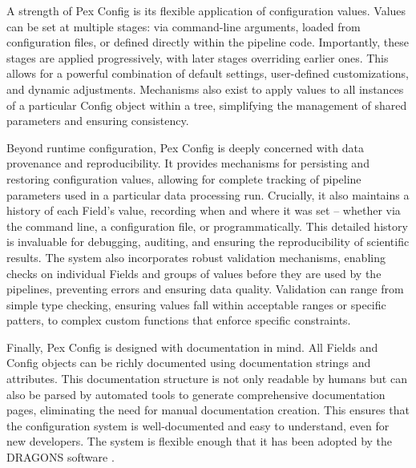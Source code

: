 A strength of Pex Config is its flexible application of configuration values.
Values can be set at multiple stages: via command-line arguments, loaded from configuration files, or defined directly within the pipeline code.
Importantly, these stages are applied progressively, with later stages overriding earlier ones.
This allows for a powerful combination of default settings, user-defined customizations, and dynamic adjustments.
Mechanisms also exist to apply values to all instances of a particular Config object within a tree, simplifying the management of shared parameters and ensuring consistency.


Beyond runtime configuration, Pex Config is deeply concerned with data provenance and reproducibility.
It provides mechanisms for persisting and restoring configuration values, allowing for complete tracking of pipeline parameters used in a particular data processing run.
Crucially, it also maintains a history of each Field's value, recording when and where it was set -- whether via the command line, a configuration file, or programmatically.
This detailed history is invaluable for debugging, auditing, and ensuring the reproducibility of scientific results.
The system also incorporates robust validation mechanisms, enabling checks on individual Fields and groups of values before they are used by the pipelines, preventing errors and ensuring data quality.
Validation can range from simple type checking, ensuring values fall within acceptable ranges or specific patters, to complex custom functions that enforce specific constraints.


Finally, Pex Config is designed with documentation in mind.
All Fields and Config objects can be richly documented using documentation strings and attributes.
This documentation structure is not only readable by humans but can also be parsed by automated tools to generate comprehensive documentation pages, eliminating the need for manual documentation creation.
This ensures that the configuration system is well-documented and easy to understand, even for new developers.
The system is flexible enough that it has been adopted by the DRAGONS software \citep{2023RNAAS...7..214L}.
